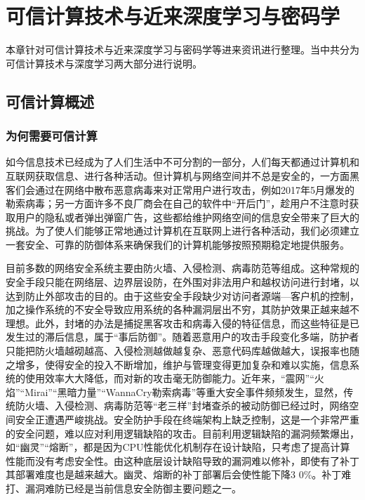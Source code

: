 \chapter{可信计算技术与近来深度学习与密码学}
\label{chap:4}

本章针对可信计算技术与近来深度学习与密码学等进来资讯进行整理。当中共分为可信计算技术与深度学习两大部分进行说明。

\section{可信计算概述}

\subsection{为何需要可信计算}

如今信息技术已经成为了人们生活中不可分割的一部分，人们每天都通过计算机和互联网获取信息、进行各种活动。但计算机与网络空间并不总是安全的，一方面黑客们会通过在网络中散布恶意病毒来对正常用户进行攻击，例如2017年5月爆发的勒索病毒；另一方面许多不良厂商会在自己的软件中“开后门”，趁用户不注意时获取用户的隐私或者弹出弹窗广告，这些都给维护网络空间的信息安全带来了巨大的挑战。为了使人们能够正常地通过计算机在互联网上进行各种活动，我们必须建立一套安全、可靠的防御体系来确保我们的计算机能够按照预期稳定地提供服务。

目前多数的网络安全系统主要由防火墙、入侵检测、病毒防范等组成。这种常规的安全手段只能在网络层、边界层设防，在外围对非法用户和越权访问进行封堵，以达到防止外部攻击的目的。由于这些安全手段缺少对访问者源端—客户机的控制，加之操作系统的不安全导致应用系统的各种漏洞层出不穷，其防护效果正越来越不理想。此外，封堵的办法是捕捉黑客攻击和病毒入侵的特征信息，而这些特征是已发生过的滞后信息，属于“事后防御”。随着恶意用户的攻击手段变化多端，防护者只能把防火墙越砌越高、入侵检测越做越复杂、恶意代码库越做越大，误报率也随之增多，使得安全的投入不断增加，维护与管理变得更加复杂和难以实施，信息系统的使用效率大大降低，而对新的攻击毫无防御能力。近年来，“震网”“火焰”“Mirai”“黑暗力量”“WannaCry勒索病毒”等重大安全事件频频发生，显然，传统防火墙、入侵检测、病毒防范等“老三样”封堵查杀的被动防御已经过时，网络空间安全正遭遇严峻挑战。安全防护手段在终端架构上缺乏控制，这是一个非常严重的安全问题，难以应对利用逻辑缺陷的攻击。目前利用逻辑缺陷的漏洞频繁爆出，如“幽灵”“熔断”，都是因为CPU性能优化机制存在设计缺陷，只考虑了提高计算性能而没有考虑安全性。由这种底层设计缺陷导致的漏洞难以修补，即使有了补丁其部署难度也是越来越大。幽灵、熔断的补丁部署后会使性能下降3 0\%。补丁难打、漏洞难防已经是当前信息安全防御主要问题之一。

